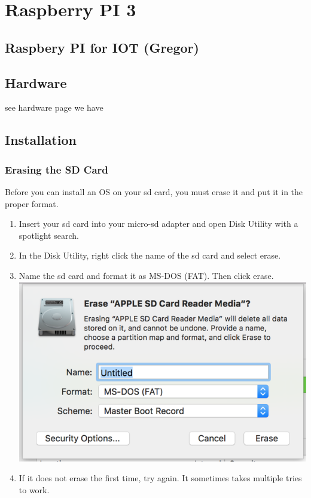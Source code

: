 \FILENAME

\section{Raspberry PI 3}\label{raspberry-pi-3}

\subsection{Raspbery PI for IOT
(Gregor)}\label{raspbery-pi-for-iot-gregor}

\subsection{Hardware}\label{hardware}

see hardware page we have

\subsection{Installation}\label{installation}

\subsubsection{Erasing the SD Card}\label{erasing-the-sd-card}

Before you can install an OS on your sd card, you must erase it and put
it in the proper format.

\begin{enumerate}
\def\labelenumi{\arabic{enumi}.}
\tightlist
\item
  Insert your sd card into your micro-sd adapter and open Disk Utility
  with a spotlight search.
\item
  In the Disk Utility, right click the name of the sd card and select
  erase.
\item
  Name the sd card and format it as MS-DOS (FAT). Then click erase.
  \includegraphics{images/diskutil.png}
\item
  If it does not erase the first time, try again. It sometimes takes
  multiple tries to work.
\end{enumerate}


